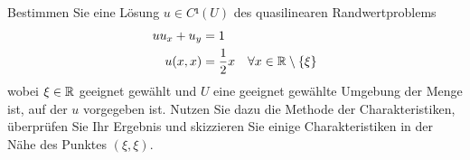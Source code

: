 \begin{exercisePage}
	\begin{task}
		Bestimmen Sie eine Lösung $u \in C¹(U)$ des quasilinearen Randwertproblems
		\begin{equation*}
			\begin{aligned}
				u u_x + u_y &= 1 \\
				u(x,x) &= \frac{1}{2}x \quad \forall x \in \mathbb{R}\setminus\left\{ \xi \right\} 
			\end{aligned} 
		\end{equation*}
		wobei $\xi \in \mathbb{R}$ geeignet gewählt und $U$ eine geeignet gewählte Umgebung der Menge ist, auf der $u$ vorgegeben ist. Nutzen Sie dazu die Methode der Charakteristiken, überprüfen Sie Ihr Ergebnis und skizzieren Sie einige Charakteristiken in der Nähe des Punktes $(\xi,\xi)$.
	\end{task}


\end{exercisePage}
